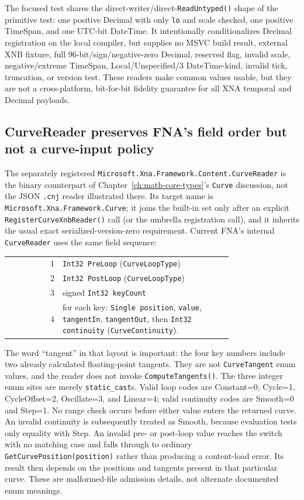 The focused test shares the direct-writer/direct-\texttt{ReadUntyped()} shape of the primitive
test: one positive Decimal with only \texttt{lo} and scale checked, one positive TimeSpan, and
one UTC-bit DateTime. It intentionally conditionalizes Decimal registration on the local compiler,
but supplies no MSVC build result, external XNB fixture, full 96-bit/sign/negative-zero Decimal,
reserved flag, invalid scale, negative/extreme TimeSpan, Local/Unspecified/3 DateTime-kind, invalid
tick, truncation, or version test. These readers make common values usable, but they are not a
cross-platform, bit-for-bit fidelity guarantee for all XNA temporal and Decimal payloads.

\subsection{CurveReader preserves FNA's field order but not a curve-input policy}
\label{sec:xnb-curve-reader-contract}

The separately registered \texttt{Microsoft.Xna.Framework.Content.CurveReader} is the binary
counterpart of Chapter~\ref{ch:math-core-types}'s \texttt{Curve} discussion, not the JSON
\texttt{.cnj} reader illustrated there. Its target name is
\texttt{Microsoft.Xna.Framework.Curve}; it joins the built-in set only after an explicit
\texttt{RegisterCurveXnbReader()} call (or the umbrella registration call), and it inherits the
usual exact serialized-version-zero requirement. Current FNA's internal \texttt{CurveReader}
uses the same field sequence:

\begin{center}
\begin{tabular}{r p{0.76\linewidth}}
  1 & \texttt{Int32 PreLoop} (\texttt{CurveLoopType}) \\
  2 & \texttt{Int32 PostLoop} (\texttt{CurveLoopType}) \\
  3 & signed \texttt{Int32 keyCount} \\
  4 & for each key: \texttt{Single position}, \texttt{value}, \texttt{tangentIn},
      \texttt{tangentOut}, then \texttt{Int32 continuity} (\texttt{CurveContinuity}).
\end{tabular}
\end{center}

The word ``tangent'' in that layout is important: the four key numbers include two already
calculated floating-point tangents. They are not \texttt{CurveTangent} enum values, and the
reader does not invoke \texttt{ComputeTangents()}. The three integer enum sites are merely
\texttt{static\_cast}s. Valid loop codes are Constant=0, Cycle=1, CycleOffset=2,
Oscillate=3, and Linear=4; valid continuity codes are Smooth=0 and Step=1. No range check
occurs before either value enters the returned curve. An invalid continuity is subsequently
treated as Smooth, because evaluation tests only equality with Step. An invalid pre- or post-loop
value reaches the switch with no matching case and falls through to ordinary
\texttt{GetCurvePosition(position)} rather than producing a content-load error. Its result then
depends on the positions and tangents present in that particular curve. These are malformed-file
admission details, not alternate documented enum meanings.

